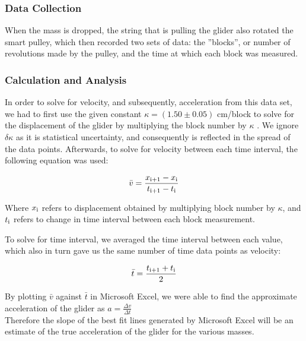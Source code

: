 \documentclass[titlepage]{article}
\begin{document}
\subsubsection{Data Collection}
When the mass is dropped, the string that is pulling the glider also rotated the smart pulley, which then recorded two sets of data: the ''blocks'', or number of revolutions made by the pulley, and the time at which each block was measured. 

\subsubsection{Calculation and Analysis}
In order to solve for velocity, and subsequently, acceleration from this data set, we had to first use the given constant $\kappa = (1.50 \pm 0.05)$ cm/block to solve for the displacement of the glider by multiplying the block number by $\kappa$ . We ignore $\delta\kappa$ as it is statistical uncertainty, and consequently is reflected in the spread of the data points. Afterwards, to solve for velocity between each time interval, the following equation was used:

\[
\bar v = \frac{x\textsubscript{i+1}-x\textsubscript{i}}{t\textsubscript{i+1}-t\textsubscript{i}}
\]

Where $x\textsubscript{i}$ refers to displacement obtained by multiplying block number by $\kappa$, and $t\textsubscript{i}$ refers to change in time interval between each block measurement.

To solve for time interval, we averaged the time interval between each value, which also in turn gave us the same number of time data points as velocity:

\[
\bar t = \frac{t\textsubscript{i+1}+t\textsubscript{i}}{2}
\]

By plotting $\bar v$ against $\bar t$ in Microsoft Excel, we were able to find the approximate acceleration of the glider as $a = \frac{\Delta v}{\Delta t}$ \\

Therefore the slope of the best fit lines generated by Microsoft Excel will be an estimate of the true acceleration of the glider for the various masses.
\end{document}
